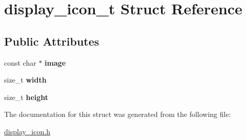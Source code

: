 \hypertarget{structdisplay__icon__t}{}\section{display\+\_\+icon\+\_\+t Struct Reference}
\label{structdisplay__icon__t}
\subsection*{Public Attributes}
\begin{DoxyCompactItemize}
\item 
const char $\ast$ {\bfseries image}\hypertarget{structdisplay__icon__t_a01946d7620c07405e494c4d8f83f956a}{}\label{structdisplay__icon__t_a01946d7620c07405e494c4d8f83f956a}

\item 
size\+\_\+t {\bfseries width}\hypertarget{structdisplay__icon__t_a42b9f6a225393cf2645287320382f615}{}\label{structdisplay__icon__t_a42b9f6a225393cf2645287320382f615}

\item 
size\+\_\+t {\bfseries height}\hypertarget{structdisplay__icon__t_a87336556858f321fb0a9d457c4bdea03}{}\label{structdisplay__icon__t_a87336556858f321fb0a9d457c4bdea03}

\end{DoxyCompactItemize}


The documentation for this struct was generated from the following file\+:\begin{DoxyCompactItemize}
\item 
\hyperlink{display__icon_8h}{display\+\_\+icon.\+h}\end{DoxyCompactItemize}
